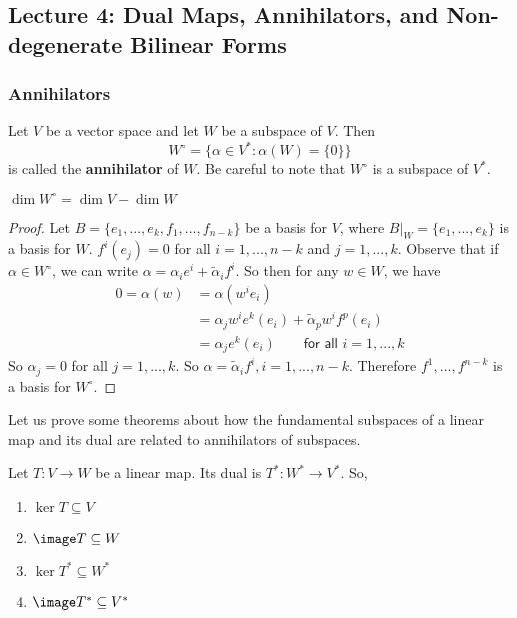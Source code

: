 \subsection{Lecture 4: Dual Maps, Annihilators, and Non-degenerate Bilinear Forms}

\subsubsection{Annihilators}
\begin{defn}[Annihilator] Let $V$ be a vector space and let $W$ be a subspace of $V$. Then 
\begin{equation}
W^\circ = \{\alpha \in V^* : \alpha(W) = \{0\}\}    
\end{equation}
is called the \textbf{annihilator} of $W$. Be careful to note that $W^\circ$ is a subspace of $V^*$.
\end{defn}
\begin{lemma}
    $\dim W^\circ = \dim V - \dim W$
\end{lemma}
\begin{proof}
    Let $B=\{e_1,...,e_k,f_1,...,f_{n-k}\}$ be a basis for $V$, where $B|_W = \{e_1,...,e_k\}$ is a basis for $W$. $f^i(e_j) = 0$ for all $i=1,...,n-k$ and $j=1,...,k$. Observe that if $\alpha \in W^\circ$, we can write $\alpha = \alpha_i e^i + \tilde{\alpha}_i f^i$. So then for any $w \in W$, we have
    \begin{align*}
        0=\alpha(w) &= \alpha(w^i e_i) \\
        &= \alpha_j w^i e^k(e_i) + \tilde{\alpha}_p w^i f^p(e_i)\\
        &= \alpha_j e^k(e_i) \qquad \textsf{for all } i=1,...,k
    \end{align*}
    So $\alpha_j = 0$ for all $j=1,...,k$. So $\alpha = \tilde{\alpha}_i f^i, i=1,...,n-k$.
    Therefore $f^1,...,f^{n-k}$ is a basis for $W^\circ$. 
\end{proof}
Let us prove some theorems about how the fundamental subspaces of a linear map and its dual are related to annihilators of subspaces. 
\begin{remark*}
    Let $T : V \to W$ be a linear map. Its dual is $T^* : W^* \to V^*$. So,
    \begin{enumerate}
    \item {
    $\ker T \subseteq V$
    }
    \item {
    $\image T \subseteq W$
    }
    \item {
    $\ker T^* \subseteq W^*$
    }
    \item {
    $\image T^* \subseteq V^*$
    }
    \end{enumerate}
\end{remark*}
